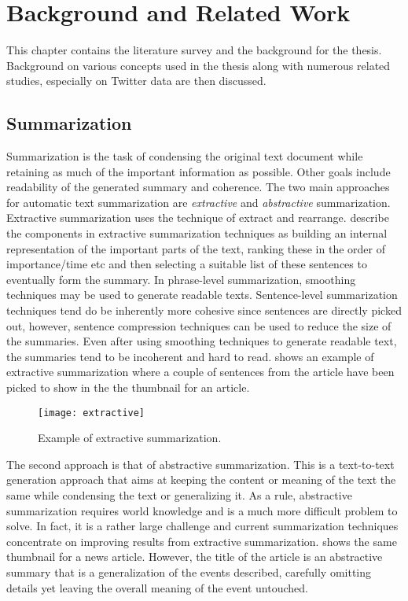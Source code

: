\chapter{Background and Related Work}
\label{chap:background}

This chapter contains the literature survey and the background for the thesis. Background on various concepts used in the thesis along with numerous related studies, especially on Twitter data are then discussed.


\section{Summarization}

Summarization is the task of condensing the original text document while retaining as much of the important information as possible. Other goals include readability of the generated summary and coherence. The two main approaches for automatic text summarization are \textit{extractive} and \textit{abstractive} summarization. Extractive summarization uses the technique of extract and rearrange. \cite{nenkova2012survey} describe the components in extractive summarization techniques as building an internal representation of the important parts of the text, ranking these in the order of importance/time etc and then selecting a suitable list of these sentences to eventually form the summary. In phrase-level summarization, smoothing techniques may be used to generate readable texts. Sentence-level summarization techniques tend do be inherently more cohesive since sentences are directly picked out, however, sentence compression techniques can be used to reduce the size of the summaries. Even after using smoothing techniques to generate readable text, the summaries tend to be incoherent and hard to read.  shows an example of extractive summarization where a couple of sentences from the article have been picked to show in the the thumbnail for an article.

\begin{figure}[!htbp]
\centering
\texttt{[image: extractive]}
\caption{Example of extractive summarization.}
\label{fig:extractive}
\end{figure}


The second approach is that of abstractive summarization. This is a text-to-text generation approach that aims at keeping the content or meaning of the text the same while condensing the text or generalizing it. As a rule, abstractive summarization requires world knowledge and is a much more difficult problem to solve. In fact, it is a rather large challenge and current summarization techniques concentrate on improving results from extractive summarization.  shows the same thumbnail for a news article. However, the title of the article is an abstractive summary that is a generalization of the events described, carefully omitting details yet leaving the overall meaning of the event untouched.

